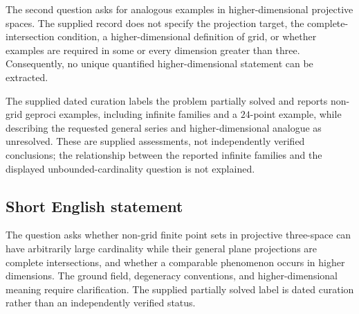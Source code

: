 \documentclass[11pt]{article}
\begin{document}
The second question asks for analogous examples in higher-dimensional projective spaces. The supplied record does not specify the projection target, the complete-intersection condition, a higher-dimensional definition of grid, or whether examples are required in some or every dimension greater than three. Consequently, no unique quantified higher-dimensional statement can be extracted.

The supplied dated curation labels the problem partially solved and reports non-grid geproci examples, including infinite families and a \(24\)-point example, while describing the requested general series and higher-dimensional analogue as unresolved. These are supplied assessments, not independently verified conclusions; the relationship between the reported infinite families and the displayed unbounded-cardinality question is not explained.
\subsection{Short English statement}
The question asks whether non-grid finite point sets in projective three-space can have arbitrarily large cardinality while their general plane projections are complete intersections, and whether a comparable phenomenon occurs in higher dimensions. The ground field, degeneracy conventions, and higher-dimensional meaning require clarification. The supplied partially solved label is dated curation rather than an independently verified status.
\end{document}
